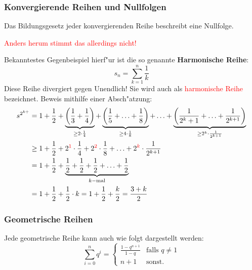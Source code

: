 \subsubsection{Konvergierende Reihen und Nullfolgen}
Das Bildungsgesetz jeder konvergierenden Reihe beschreibt eine Nullfolge.
\begin{center}
\textcolor{red}{Anders herum stimmt das allerdings nicht!}
\end{center}
Bekanntestes Gegenbeispiel hierf"ur ist die so genannte \textbf{Harmonische Reihe}:
\begin{equation*}
s_n = \sum\limits_{k=1}^{n}\frac{1}{k}
\end{equation*}
Diese Reihe divergiert gegen Unendlich! Sie wird auch als \textcolor{red}{harmonische Reihe} bezeichnet. Beweis mithilfe einer Absch"atzung:
\begin{align*}
s^{2^{k+}} &= 1 + \frac{1}{2} + \underbrace{\left( \frac{1}{3} + \frac{1}{4} \right)}_{\geq 2 \cdot \frac{1}{4}} + \underbrace{\left( \frac{1}{5} + \ldots + \frac{1}{8} \right)}_{\geq 4 \cdot \frac{1}{8}} + \ldots + \underbrace{\left( \frac{1}{2^k + 1} + \ldots + \frac{1}{2^{k+1}} \right)}_{\geq 2^k \cdot \frac{1}{2^{k + 1}}}\\
&\geq 1 + \frac{1}{2} + 2^{\color{red}1} \cdot \frac{1}{4} + 2^{\color{red}2} \cdot \frac{1}{8} + \ldots + 2^{\color{red}k} \cdot \frac{1}{2^{k+1}} \\
&= 1 + \frac{1}{2} + \underbrace{\frac{1}{2} + \frac{1}{2} + \frac{1}{2} + \ldots + \frac{1}{2}}_{k-\text{mal}}\\
&= 1 + \frac{1}{2} + \frac{1}{2} \cdot k =  1 + \frac{1}{2} + \frac{k}{2} = \frac{3 + k}{2}
\end{align*}

\subsubsection{Geometrische Reihen}
Jede geometrische Reihe kann auch wie folgt dargestellt werden:
\begin{equation*}
\sum\limits_{i=0}^{n} q^i = \begin{cases} \frac{1-q^{n+1}}{1-q} &\mbox{falls } q \neq 1 \\ 
n + 1 & \mbox{sonst.} \end{cases}
\end{equation*}
